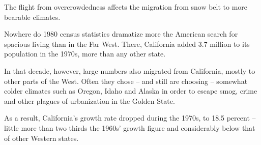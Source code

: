 \documentclass[a4paper]{article}
\begin{document}
\par
The flight from overcrowdedness affects the migration from snow belt to more bearable climates.

\par
Nowhere do 1980 census statistics dramatize more the American search for spacious living than in the Far West. There, California added 3.7 million to its population in the 1970s, more than any other state.

\par
In that decade, however, large numbers also migrated from California, mostly to other parts of the West. Often they chose -- and still are choosing -- somewhat colder climates such as Oregon, Idaho and Alaska in order to escape smog, crime and other plagues of urbanization in the Golden State.

\par
As a result, California’s growth rate dropped during the 1970s, to 18.5 percent -- little more than two thirds the 1960s’ growth figure and considerably below that of other Western states.
\end{document}
